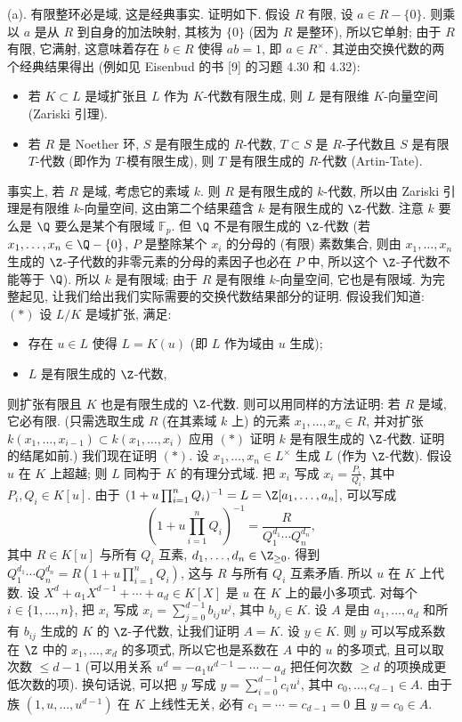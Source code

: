 \begin{solution}
(a). 有限整环必是域, 这是经典事实. 证明如下. 假设 $R$ 有限, 设 $a \in R - \{0\}$. 则乘以 $a$ 是从 $R$ 到自身的加法映射, 其核为 $\{0\}$ (因为 $R$ 是整环), 所以它单射; 由于 $R$ 有限, 它满射, 这意味着存在 $b \in R$ 使得 $ab = 1$, 即 $a \in R^{\times}$.
其逆由交换代数的两个经典结果得出 (例如见 Eisenbud 的书 {[}9{]} 的习题 4.30 和 4.32):
\begin{itemize}
\item 若 $K \subset L$ 是域扩张且 $L$ 作为 $K$-代数有限生成, 则 $L$ 是有限维 $K$-向量空间 (Zariski 引理).
\item 若 $R$ 是 Noether 环, $S$ 是有限生成的 $R$-代数, $T \subset S$ 是 $R$-子代数且 $S$ 是有限 $T$-代数 (即作为 $T$-模有限生成), 则 $T$ 是有限生成的 $R$-代数 (Artin-Tate).
\end{itemize}
事实上, 若 $R$ 是域, 考虑它的素域 $k$. 则 $R$ 是有限生成的 $k$-代数, 所以由 Zariski 引理是有限维 $k$-向量空间, 这由第二个结果蕴含 $k$ 是有限生成的 $\Z$-代数. 注意 $k$ 要么是 $\Q$ 要么是某个有限域 $\mathbb{F}_p$. 但 $\Q$ 不是有限生成的 $\Z$-代数 (若 $x_1, \ldots, x_n \in \Q - \{0\}$, $P$ 是整除某个 $x_i$ 的分母的 (有限) 素数集合, 则由 $x_1, \ldots, x_n$ 生成的 $\Z$-子代数的非零元素的分母的素因子也必在 $P$ 中, 所以这个 $\Z$-子代数不能等于 $\Q$). 所以 $k$ 是有限域; 由于 $R$ 是有限维 $k$-向量空间, 它也是有限域.
为完整起见, 让我们给出我们实际需要的交换代数结果部分的证明. 假设我们知道:
$(*)$ 设 $L/K$ 是域扩张, 满足:
\begin{itemize}
\item 存在 $u \in L$ 使得 $L = K(u)$ (即 $L$ 作为域由 $u$ 生成);
\item $L$ 是有限生成的 $\Z$-代数,
\end{itemize}
则扩张有限且 $K$ 也是有限生成的 $\Z$-代数.
则可以用同样的方法证明: 若 $R$ 是域, 它必有限. (只需选取生成 $R$ (在其素域 $k$ 上) 的元素 $x_1, \ldots, x_n \in R$, 并对扩张 $k(x_1, \ldots, x_{i-1}) \subset k(x_1, \ldots, x_i)$ 应用 $(*)$ 证明 $k$ 是有限生成的 $\Z$-代数. 证明的结尾如前.)
我们现在证明 $(*)$. 设 $x_1, \ldots, x_n \in L^{\times}$ 生成 $L$ (作为 $\Z$-代数). 假设 $u$ 在 $K$ 上超越; 则 $L$ 同构于 $K$ 的有理分式域. 把 $x_i$ 写成 $x_i = \frac{P_i}{Q_i}$, 其中 $P_i, Q_i \in K[u]$. 由于 $(1 + u\prod_{i=1}^nQ_i)^{-1} = L = \Z[a_1, \ldots, a_n]$, 可以写成
\[
(1 + u\prod_{i=1}^nQ_i)^{-1} = \frac{R}{Q_1^{d_1}\cdots Q_n^{d_n}},
\]
其中 $R \in K[u]$ 与所有 $Q_i$ 互素, $d_1, \ldots, d_n \in \Z_{\geq 0}$. 得到 $Q_1^{d_1}\cdots Q_n^{d_n} = R(1 + u\prod_{i=1}^nQ_i)$, 这与 $R$ 与所有 $Q_i$ 互素矛盾. 所以 $u$ 在 $K$ 上代数. 设 $X^d + a_1X^{d-1} + \cdots + a_d \in K[X]$ 是 $u$ 在 $K$ 上的最小多项式. 对每个 $i \in \{1, \ldots, n\}$, 把 $x_i$ 写成 $x_i = \sum_{j=0}^{d-1}b_{ij}u^j$, 其中 $b_{ij} \in K$. 设 $A$ 是由 $a_1, \ldots, a_d$ 和所有 $b_{ij}$ 生成的 $K$ 的 $\Z$-子代数, 让我们证明 $A = K$. 设 $y \in K$. 则 $y$ 可以写成系数在 $\Z$ 中的 $x_1, \ldots, x_d$ 的多项式, 所以它也是系数在 $A$ 中的 $u$ 的多项式, 且可以取次数 $\leq d-1$ (可以用关系 $u^d = -a_1u^{d-1} - \cdots - a_d$ 把任何次数 $\geq d$ 的项换成更低次数的项). 换句话说, 可以把 $y$ 写成 $y = \sum_{i=0}^{d-1}c_iu^i$, 其中 $c_0, \ldots, c_{d-1} \in A$. 由于族 $(1, u, \ldots, u^{d-1})$ 在 $K$ 上线性无关, 必有 $c_1 = \cdots = c_{d-1} = 0$ 且 $y = c_0 \in A$.


\end{solution}
